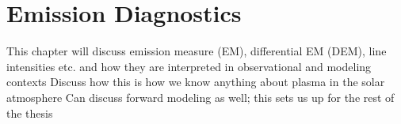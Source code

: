 \chapter{Emission Diagnostics}
\label{ch:emission}
This chapter will discuss emission measure (EM), differential EM (DEM), line intensities etc.
and how they are interpreted in observational and modeling contexts
Discuss how this is how we know anything about plasma in the solar atmosphere
Can discuss forward modeling as well; this sets us up for the rest of the thesis